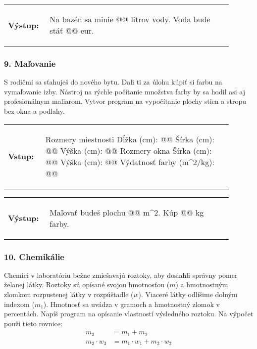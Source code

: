 \vspace{-2em}
\begin{tabular}{@{}p{0.15\linewidth}p{0.75\linewidth}}
\textbf{\small Výstup:} &
\vspace{-3em}
\begin{code}
Na bazén sa minie @\fbox{\phantom{vstup}}@ litrov vody.
Voda bude stáť @\fbox{\phantom{vstup}}@ eur.
\end{code}
\end{tabular}
\vspace{-2em}

\subsubsection*{9. Maľovanie}
S rodičmi sa sťahuješ do nového bytu. Dali ti za úlohu kúpiť si farbu na vymaľovanie izby. Nástroj na rýchle počítanie množstva farby by sa hodil asi aj profesionálnym maliarom. Vytvor program na vypočítanie plochy stien a stropu bez okna a podlahy.

\begin{tabular}{@{}p{0.15\linewidth}p{0.75\linewidth}}
\textbf{\small Vstup:} &
\vspace{-3em}
\begin{code}
Rozmery miestnosti
Dĺžka (cm): @\fbox{\phantom{vstup}}@
Šírka (cm): @\fbox{\phantom{vstup}}@
Výška (cm): @\fbox{\phantom{vstup}}@
Rozmery okna
Šírka (cm): @\fbox{\phantom{vstup}}@
Výška (cm): @\fbox{\phantom{vstup}}@
Výdatnosť farby (m^2/kg): @\fbox{\phantom{vstup}}@
\end{code}
\end{tabular}

\vspace{-2em}
\begin{tabular}{@{}p{0.15\linewidth}p{0.75\linewidth}}
\textbf{\small Výstup:} &
\vspace{-3em}
\begin{code}
Maľovať budeš plochu @\fbox{\phantom{vstup}}@ m^2. 
Kúp @\fbox{\phantom{vstup}}@ kg farby.
\end{code}
\end{tabular}
\vspace{-2em}

\subsubsection*{10. Chemikálie}
Chemici v laboratóriu bežne zmiešavajú roztoky, aby dosiahli správny pomer želanej látky. Roztoky sú opísané svojou hmotnosťou ($m$) a hmotnostným zlomkom rozpustenej látky v rozpúštadle ($w$). Viaceré látky odlíšime dolným indexom ($m_1$).  Hmotnosť sa uvádza v gramoch a hmotnostný zlomok v percentách. Napíš program na opísanie vlastností výsledného roztoku. Na výpočet použi tieto rovnice:
\begin{align*}
m_3 &= m_1 + m_2 \\
m_3 \cdot w_3 &= m_1 \cdot w_1 +  m_2 \cdot w_2
\end{align*}

